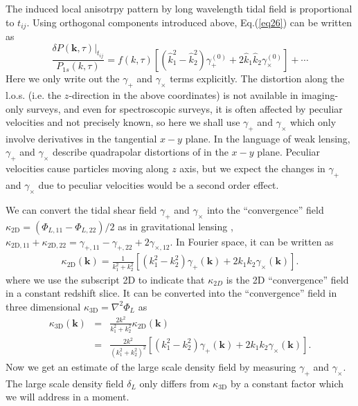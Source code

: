\documentclass[aps,prd,twocolumn,showpacs,superscriptaddress,groupedaddress,nofootinbib]{revtex4}  %
\newcommand{\mr}{\mathrm}
\begin{document}
The induced local anisotrpy pattern by long wavelength tidal field is 
proportional to $t_{ij}$. Using orthogonal components introduced above, 
Eq.(\ref{eq26}) can be written as
\begin{equation}
\frac{\delta P(\bm{k},\tau)|_{t_{ij}}}{P_{1s}(k,\tau)}=f(k,\tau)
[(\hat{k}_1^2-\hat{k}_2^2)\gamma_+^{(0)}+
2\hat{k}_1\hat{k}_2\gamma_{\times}^{(0)}]+ \cdots
\end{equation}
Here we only write out the $\gamma_+$ and $\gamma_\times$ terms explicitly.
The distortion along the l.o.s. (i.e. the $z$-direction in the above coordinates) 
is not available in imaging-only surveys,  and even for spectroscopic surveys, 
it is often affected by peculiar velocities and 
not precisely known, so here we shall use $\gamma_{+}$
and $\gamma_{\times}$ which only involve derivatives in the tangential $x-y$ plane.
In the language of weak lensing, $\gamma_+$ and $\gamma_\times$ describe
quadrapolar distortions of in the $x-y$ plane.
Peculiar velocities cause particles moving along $z$ axis, but we expect the
changes in $\gamma_+$ and $\gamma_\times$ due to peculiar velocities would be a
second order effect.

We can convert the tidal shear field $\gamma_+$ and $\gamma_\times$ into 
the ``convergence'' field $\kappa_\mr{2D}=(\Phi_{L,11}-\Phi_{L,22})/2$ as in 
gravitational lensing \cite{1993kaiser}, 
$\kappa_{\mr{2D},11}+\kappa_{\mr{2D},22}=
\gamma_{+,11}-\gamma_{+,22}+2\gamma_{\times,12}$.
In Fourier space, it can be written as
\begin{eqnarray}
\kappa_\mr{2D}(\bm{k})=\frac{1}{k_1^2+k_2^2}[(k_1^2-k_2^2)\gamma_+(\bm{k})
+2k_1k_2\gamma_\times(\bm{k})].
\end{eqnarray}
where we use the subscript 2D to indicate that $\kappa_{2D}$ is the 2D ``convergence'' field in
a constant redshift slice. It can be converted into the ``convergence'' 
field in three dimensional $\kappa_\mr{3D}=\nabla^2\Phi_L$ as
\begin{eqnarray}
\label{eq:kappa}
\kappa_\mr{3D}(\bm{k})&=&\frac{2k^2}{k_1^2+k_2^2}\kappa_\mr{2D}(\bm{k})\\
&=&\frac{2k^2}{(k_1^2+k_2^2)^2}
[({k}_{1}^2-{k}_{2}^2)\gamma_+(\bm{k})
+2{k}_{1}{k}_{2}\gamma_\times(\bm{k})].\nonumber
\end{eqnarray}
Now we get an estimate of the large scale density field by measuring $\gamma_+$
and $\gamma_\times$. The large scale density field $\delta_L$ only differs from
$\kappa_\mr{3D}$ by a constant factor which we will address in a moment.
\end{document}
